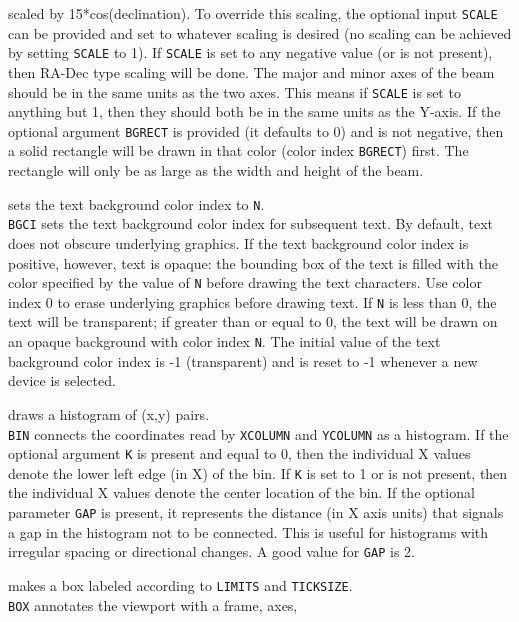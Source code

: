 	scaled by 15*cos(declination).  To override this scaling, the optional
	input {\tt SCALE} can be provided and set to whatever
	scaling is desired (no scaling can be achieved by setting
	{\tt SCALE} to 1).  If {\tt SCALE} is set to any
	negative value (or is not present), then RA-Dec type scaling will be
	done.  The major and minor axes of the beam should be in the same
	units as the two axes.  This means if {\tt SCALE} is set
	to anything but 1, then they should both be in the same units
	as the Y-axis.
	If the optional argument {\tt BGRECT} is provided
	(it defaults to 0) and is not negative, then a solid rectangle
	will be drawn in that color (color index {\tt BGRECT}) first.
	The rectangle will only be as large as the width and height of the beam.
\item [{\tt BGCI N } --] sets the text background color index to {\tt N}.\\
	{\tt BGCI} sets the text background color index for
	subsequent text.  By default, text does not obscure underlying
	graphics.  If the text background color index is positive,
	however, text is opaque:  the bounding box of the text is
	filled with the color specified by the value of {\tt N}
	before drawing the text characters.  Use color index 0 to erase
	underlying graphics before drawing text.  If {\tt N} is
	less than 0, the text will be transparent; if greater than or
	equal to 0, the text will be drawn on an opaque background with
	color index {\tt N}.  The initial value of the text
	background color index is -1 (transparent) and is reset to -1
	whenever a new device is selected.
\item [{\tt BIN [K [GAP] ] } --] draws a histogram of (x,y) pairs.\\
	{\tt BIN} connects the coordinates read by
	{\tt XCOLUMN} and
	{\tt YCOLUMN} as a histogram.  If
	the optional argument {\tt K} is present and equal to 0,
	then the individual X values denote the lower left edge (in X)
	of the bin.  If {\tt K} is set to 1 or is not present,
	then the individual X values denote the center location of the
	bin.  If the optional parameter {\tt GAP} is present, it
	represents the distance (in X axis units) that signals a gap in
	the histogram not to be connected.  This is useful for histograms
	with irregular spacing or directional changes.  A good value
	for {\tt GAP} is 2.
\item [{\tt BOX [x [y] ] } --] makes a box labeled according to {\tt LIMITS} and {\tt TICKSIZE}.\\
	{\tt BOX} annotates the viewport with a frame, axes,
